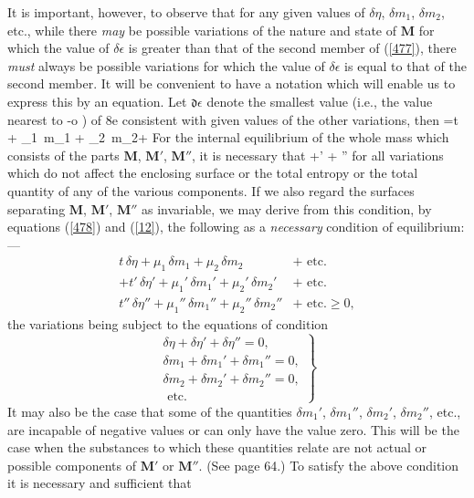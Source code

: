 \documentclass[12pt]{article}
\newcommand{\dd}{\delta}
\newcommand{\ddd}{\mathfrak{d}}
\begin{document}
{It is important, however, to observe that for any given values of $\delta \eta$, $\delta m_1$, $\delta m_2$, etc., while there \textit{may} be possible variations of the nature and state of $\mathbf{M}$ for which the value of $\delta \epsilon$ is greater than that of the second member of (\ref{477}), there \textit{must} always be possible variations for which the value of $\delta \epsilon$ is equal to that of the second member. It will be convenient to have a notation which will enable us to express this by an equation. Let $\ddd \epsilon$ denote the smallest value (i.e., the value nearest to -o ) of 8e consistent with given values of the other variations, then
\eqs \dd \epsilon =t \,\dd \eta+ \mu_1 \,\dd m_1 + \mu_2 \,\dd m_2+ \label{478} \eqe
For the internal equilibrium of the whole mass which consists of
the parts $\mathbf{M}$, $\mathbf{M}'$, $\mathbf{M}''$, it is necessary that
\eqs \dd \epsilon +\dd \epsilon' +  \dd \epsilon'' \label{479} \eqe
for all variations which do not affect the enclosing surface or the total entropy or the total quantity of any of the various components. If we also regard the surfaces separating $\mathbf{M}$, $\mathbf{M}'$, $\mathbf{M}''$ as invariable, we may derive from this condition, by equations (\ref{478}) and (\ref{12}), the following as a \textit{necessary} condition of equilibrium:---
\begin{align}
t \, \dd \eta +\mu_1 \,\dd m_1 + \mu_2 \,\dd m_2 &+ \text{ etc.} \nonumber \\
+ t' \, \dd \eta' +\mu_1' \,\dd m_1' + \mu_2' \,\dd m_2' &+ \text{ etc.} \nonumber \\
 t'' \, \dd \eta'' +\mu_1'' \,\dd m_1'' + \mu_2'' \,\dd m_2'' &+ \text{ etc.}  \geq 0,  \label{480} \end{align}
the variations being subject to the equations of condition
\begin{equation}\left.\begin{array}{r}
\dd \eta + \dd\eta' +\dd\eta'' = 0, \\
\dd m_1 + \dd m_1' +\dd m_1'' = 0,   \\          
\dd m_2 + \dd m_2' +\dd m_2'' = 0, \\
\text{ etc.} \end{array} \label{481} \right\} \end{equation}
It may also be the case that some of the quantities $\dd m_1'$, $\dd m_1''$, $\dd m_2'$, $\dd m_2''$, etc., are incapable of negative values or can only have the value zero. This will be the case when the substances to which these quantities relate are not actual or possible components of $\mathbf{M}'$ or $\mathbf{M}''$. (See page 64.) To satisfy the above condition it is necessary and sufficient that
}
\end{document}
